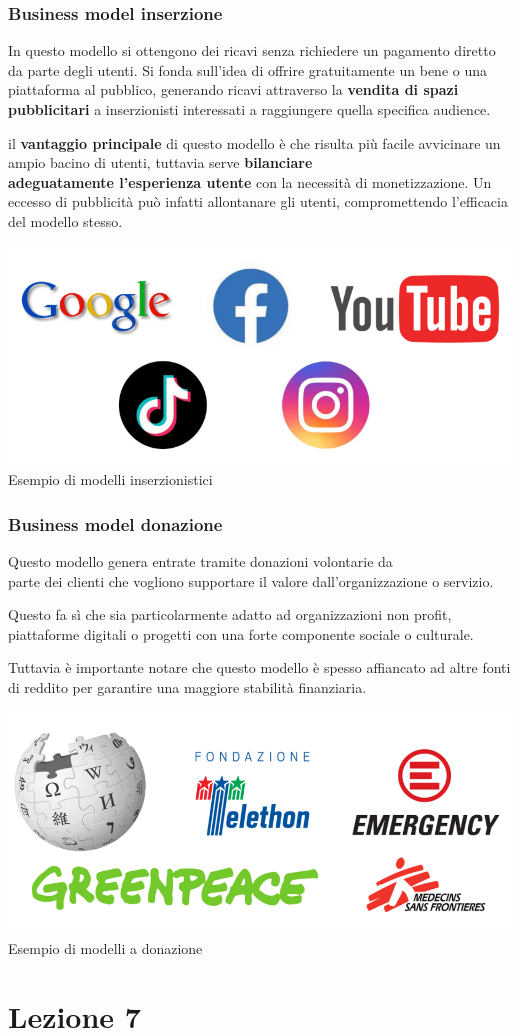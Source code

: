 \documentclass[14pt]{extarticle}
\begin{document}
\newpage
\subsubsection{Business model inserzione}

In questo modello si ottengono dei ricavi senza richiedere un pagamento diretto
da parte degli utenti. Si fonda sull'idea di offrire gratuitamente un bene o una
piattaforma al pubblico, generando ricavi attraverso la \textbf{vendita di spazi
pubblicitari} a inserzionisti interessati a raggiungere quella specifica
audience.

il \textbf{vantaggio principale} di questo modello è che risulta più facile
avvicinare un ampio bacino di utenti, tuttavia serve \textbf{bilanciare
\\adeguatamente l'esperienza utente} con la necessità di monetizzazione. Un
eccesso di pubblicità può infatti allontanare gli utenti, compromettendo
l'efficacia del modello stesso.

\begin{center}
    \includegraphics[scale=0.60]{images/inserzioni.png}
    Esempio di modelli inserzionistici
\end{center}

\subsubsection{Business model donazione}

Questo modello genera entrate tramite donazioni volontarie da \\parte dei
clienti che vogliono supportare il valore dall'organizzazione o servizio.

Questo fa sì che sia particolarmente adatto ad organizzazioni non profit,
piattaforme digitali o progetti con una forte componente sociale o culturale.

Tuttavia è importante notare che questo modello è spesso affiancato ad altre
fonti di reddito per garantire una maggiore stabilità finanziaria.

\begin{center}
    \includegraphics[scale=0.60]{images/donazioni.png}
    Esempio di modelli a donazione
\end{center}

\section{Lezione 7}
\end{document}
